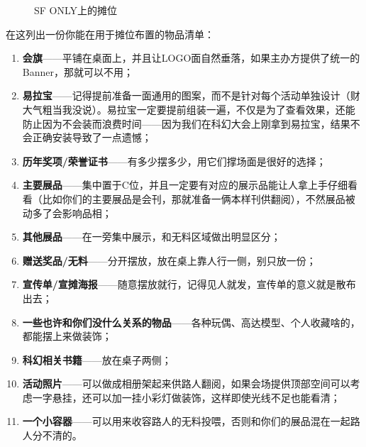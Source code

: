 \begin{figure}[H]
\centering
{}
\caption{SF ONLY上的摊位}
\end{figure}

在这列出一份你能在用于摊位布置的物品清单：

\begin{enumerate}
\def\labelenumi{\arabic{enumi}.}
\item
  \textbf{会旗}------平铺在桌面上，并且让LOGO面自然垂落，如果主办方提供了统一的Banner，那就可以不用；
\item
  \textbf{易拉宝}------记得提前准备一面通用的图案，而不是针对每个活动单独设计（财大气粗当我没说）。易拉宝一定要提前组装一遍，不仅是为了查看效果，还能防止因为不会装而浪费时间------因为我们在科幻大会上刚拿到易拉宝，结果不会正确安装导致了一点遗憾；
\item
  \textbf{历年奖项/荣誉证书}------有多少摆多少，用它们撑场面是很好的选择；
\item
  \textbf{主要展品}------集中置于C位，并且一定要有对应的展示品能让人拿上手仔细看看（比如你们的主要展品是会刊，那就准备一俩本样刊供翻阅），不然展品被动多了会影响品相；
\item
  \textbf{其他展品}------在一旁集中展示，和无料区域做出明显区分；
\item
  \textbf{赠送奖品/无料}------分开摆放，放在桌上靠人行一侧，别只放一份；
\item
  \textbf{宣传单/宣摊海报}------随意摆放就行，记得见人就发，宣传单的意义就是散布出去；
\item
  \textbf{一些也许和你们没什么关系的物品}------各种玩偶、高达模型、个人收藏啥的，都能摆上来做装饰；
\item
  \textbf{科幻相关书籍}------放在桌子两侧；
\item
  \textbf{活动照片}------可以做成相册架起来供路人翻阅，如果会场提供顶部空间可以考虑一字悬挂，还可以加一挂小彩灯做装饰，这样即使光线不足也能看清；
\item
  \textbf{一个小容器}------可以用来收容路人的无料投喂，否则和你们的展品混在一起路人分不清的。
\end{enumerate}

